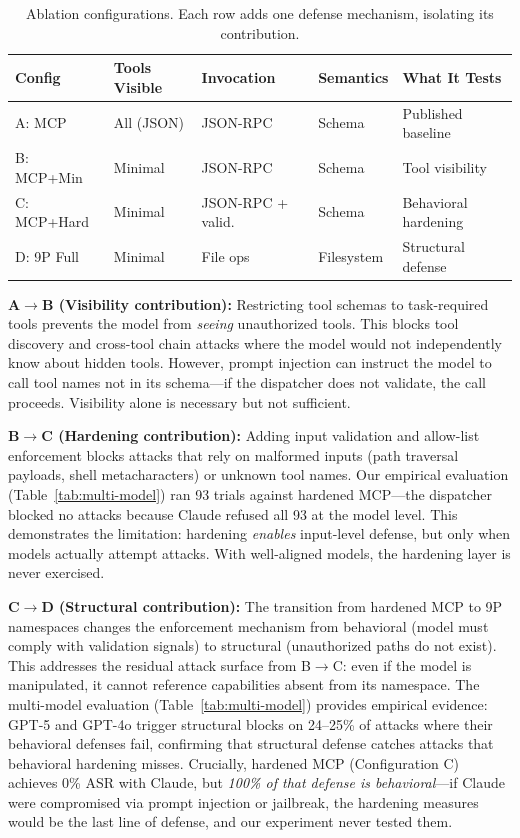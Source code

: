\documentclass{article}
\begin{document}
\begin{table}[h]
\centering
\small
\begin{tabular}{lp{1.5cm}p{1.5cm}p{1.5cm}p{2.2cm}}
\hline
\textbf{Config} & \textbf{Tools Visible} & \textbf{Invocation} & \textbf{Semantics} & \textbf{What It Tests} \\
\hline
A: MCP & All (JSON) & JSON-RPC & Schema & Published baseline \\
B: MCP+Min & Minimal & JSON-RPC & Schema & Tool visibility \\
C: MCP+Hard & Minimal & JSON-RPC + valid. & Schema & Behavioral hardening \\
D: 9P Full & Minimal & File ops & Filesystem & Structural defense \\
\hline
\end{tabular}
\caption{Ablation configurations. Each row adds one defense mechanism, isolating its contribution.}
\label{tab:ablation-configs}
\end{table}

\textbf{A$\rightarrow$B (Visibility contribution):} Restricting tool schemas to task-required tools prevents the model from \textit{seeing} unauthorized tools. This blocks tool discovery and cross-tool chain attacks where the model would not independently know about hidden tools. However, prompt injection can instruct the model to call tool names not in its schema---if the dispatcher does not validate, the call proceeds. Visibility alone is necessary but not sufficient.

\textbf{B$\rightarrow$C (Hardening contribution):} Adding input validation and allow-list enforcement blocks attacks that rely on malformed inputs (path traversal payloads, shell metacharacters) or unknown tool names. Our empirical evaluation (Table~\ref{tab:multi-model}) ran 93 trials against hardened MCP---the dispatcher blocked no attacks because Claude refused all 93 at the model level. This demonstrates the limitation: hardening \textit{enables} input-level defense, but only when models actually attempt attacks. With well-aligned models, the hardening layer is never exercised.

\textbf{C$\rightarrow$D (Structural contribution):} The transition from hardened MCP to 9P namespaces changes the enforcement mechanism from behavioral (model must comply with validation signals) to structural (unauthorized paths do not exist). This addresses the residual attack surface from B$\rightarrow$C: even if the model is manipulated, it cannot reference capabilities absent from its namespace. The multi-model evaluation (Table~\ref{tab:multi-model}) provides empirical evidence: GPT-5 and GPT-4o trigger structural blocks on 24--25\% of attacks where their behavioral defenses fail, confirming that structural defense catches attacks that behavioral hardening misses. Crucially, hardened MCP (Configuration C) achieves 0\% ASR with Claude, but \textit{100\% of that defense is behavioral}---if Claude were compromised via prompt injection or jailbreak, the hardening measures would be the last line of defense, and our experiment never tested them.
\end{document}
